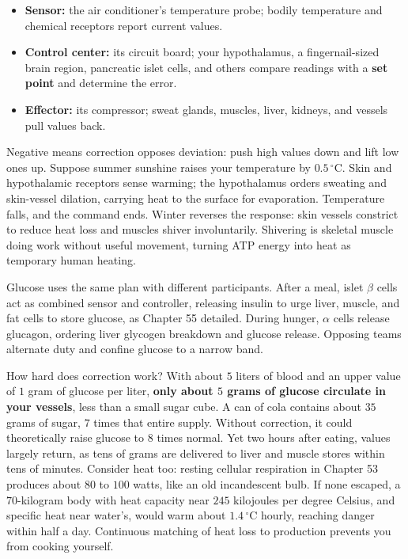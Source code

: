 \begin{itemize}[itemsep=2pt]
\item \textbf{Sensor:} the air conditioner's temperature probe; bodily temperature and chemical receptors report current values.
\item \textbf{Control center:} its circuit board; your hypothalamus, a fingernail-sized brain region, pancreatic islet cells, and others compare readings with a \textbf{set point} and determine the error.
\item \textbf{Effector:} its compressor; sweat glands, muscles, liver, kidneys, and vessels pull values back.
\end{itemize}

Negative means correction opposes deviation: push high values down and lift low ones up. Suppose summer sunshine raises your temperature by $0.5\,^{\circ}\mathrm{C}$. Skin and hypothalamic receptors sense warming; the hypothalamus orders sweating and skin-vessel dilation, carrying heat to the surface for evaporation. Temperature falls, and the command ends. Winter reverses the response: skin vessels constrict to reduce heat loss and muscles shiver involuntarily. Shivering is skeletal muscle doing work without useful movement, turning ATP energy into heat as temporary human heating.

Glucose uses the same plan with different participants. After a meal, islet $\beta$ cells act as combined sensor and controller, releasing insulin to urge liver, muscle, and fat cells to store glucose, as Chapter 55 detailed. During hunger, $\alpha$ cells release glucagon, ordering liver glycogen breakdown and glucose release. Opposing teams alternate duty and confine glucose to a narrow band.

\begin{qiaoliang}
How hard does correction work? With about $5$ liters of blood and an upper value of $1$ gram of glucose per liter, \textbf{only about $5$ grams of glucose circulate in your vessels}, less than a small sugar cube. A can of cola contains about $35$ grams of sugar, $7$ times that entire supply. Without correction, it could theoretically raise glucose to $8$ times normal. Yet two hours after eating, values largely return, as tens of grams are delivered to liver and muscle stores within tens of minutes. Consider heat too: resting cellular respiration in Chapter 53 produces about $80$ to $100$ watts, like an old incandescent bulb. If none escaped, a $70$-kilogram body with heat capacity near $245$ kilojoules per degree Celsius, and specific heat near water's, would warm about $1.4\,^{\circ}\mathrm{C}$ hourly, reaching danger within half a day. Continuous matching of heat loss to production prevents you from cooking yourself.
\end{qiaoliang}

